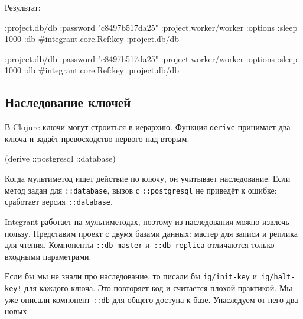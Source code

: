 \fi

\noindent
Результат:

\ifx\DEVICETYPE\MOBILE

\begin{english}
  \begin{clojure}
{:project.db/db
 {:password "c8497b517da25"}
 :project.worker/worker
 {:options {:sleep 1000}
  :db
  #integrant.core.Ref{:key
                      :project.db/db}}}
  \end{clojure}
\end{english}

\else

\begin{english}
  \begin{clojure}
{:project.db/db {:password "c8497b517da25"}
 :project.worker/worker
 {:options {:sleep 1000}
  :db #integrant.core.Ref{:key :project.db/db}}}
  \end{clojure}
\end{english}

\fi

\subsection{Наследование ключей}


В Clojure ключи могут строиться в иерархию. Функция \verb|derive| принимает
два ключа и задаёт превосходство первого над вторым.


\begin{english}
  \begin{clojure}
(derive ::postgresql ::database)
  \end{clojure}
\end{english}

\mnoindent
Когда мультиметод ищет действие по ключу, он учитывает наследование. Если метод
задан для \verb|::database|, вызов с \verb|::postgresql| не приведёт к ошибке:
сработает версия \verb|::database|.

Integrant работает на мультиметодах, поэтому из наследования можно извлечь
пользу. Представим проект с двумя базами данных: мастер для записи и реплика для
чтения. Компоненты \verb|::db-master| и~\verb|::db-replica| отличаются только
входными параметрами.

Если бы мы не знали про наследование, то писали бы \verb|ig/init-key|
и~\verb|ig/halt-key!| для каждого ключа. Это повторяет код и считается плохой
практикой. Мы уже описали компонент \verb|::db| для общего доступа к
базе. Унаследуем от него два новых:

